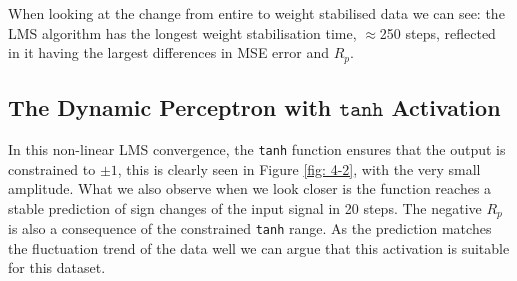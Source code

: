\documentclass[12pt]{article}
\numberwithin{equation}{section}
\begin{document}
		When looking at the change from entire to weight stabilised data we can see: the LMS algorithm has the longest weight stabilisation time, $\approx$250 steps, reflected in it having the largest differences in MSE error and $R_p$.
	\subsection{The Dynamic Perceptron with $\texttt{tanh}$ Activation} \label{sec: 4-2-dynamic-perc}
		\begin{minipage}[b]{0.49\textwidth}
			In this non-linear LMS convergence, the \texttt{tanh} function ensures that the output is constrained to $\pm1$, this is clearly seen in Figure \ref{fig: 4-2}, with the very small amplitude. What we also observe when we look closer is the function reaches a stable prediction of sign changes of the input signal in 20 steps. The negative $R_p$ is also a consequence of the constrained \texttt{tanh} range. As the prediction matches the fluctuation trend of the data well we can argue that this activation is suitable for this dataset.
		\end{minipage}%
		\begin{minipage}{0.04\textwidth}
			\hspace*{0.04\textwidth}
		\end{minipage}%
\end{document}
